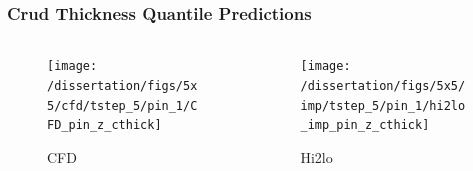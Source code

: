 \documentclass[t, pdftex]{beamer}
\begin{document}
\begin{frame}
\frametitle{Crud Thickness Quantile Predictions}
\vspace{-22pt}
\begin{columns}
    \begin{column}{0.5\textwidth}
        \begin{figure}[H]%
            \texttt{[image: /dissertation/figs/5x5/cfd/tstep\_5/pin\_1/CFD\_pin\_z\_cthick]}\\
            \caption{\centering CFD}
        \end{figure}
    \end{column}
    \begin{column}{0.5\textwidth}
        \begin{figure}[H]%
            \texttt{[image: /dissertation/figs/5x5/imp/tstep\_5/pin\_1/hi2lo\_imp\_pin\_z\_cthick]}
            \caption{\centering Hi2lo}
        \end{figure}
    \end{column}
\end{columns}
\end{frame}
\end{document}
